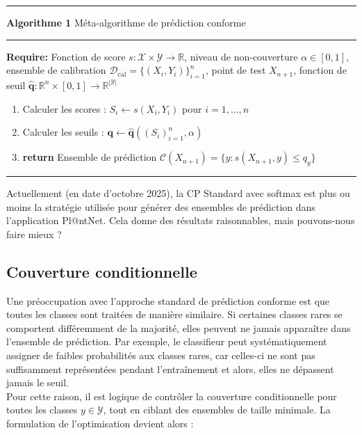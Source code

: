 \documentclass[12pt,a4paper]{article}
\begin{document}
\noindent
\rule{\textwidth}{1pt}
\textbf{Algorithme 1} Méta-algorithme de prédiction conforme \\
\rule{\textwidth}{0.5pt}
\textbf{Require:} Fonction de score $s : \mathcal{X} \times \mathcal{Y} \to \mathbb{R}$, niveau de non-couverture $\alpha \in [0, 1]$, ensemble de calibration $\mathcal{D}_{\text{cal}} = \{(X_i, Y_i)\}_{i=1}^n$, point de test $X_{n+1}$, fonction de seuil $\hat{\mathbf{q}} : \mathbb{R}^n \times [0, 1] \to \mathbb{R}^{|\mathcal{Y}|}$

\begin{enumerate}[label=\arabic*:, itemsep=0pt]
\item Calculer les scores : $S_i \leftarrow s(X_i, Y_i)$ pour $i = 1, \dots, n$
\item Calculer les seuils : $\mathbf{q} \leftarrow \hat{\mathbf{q}}((S_i)_{i=1}^n, \alpha)$
\item \textbf{return} Ensemble de prédiction $\mathcal{C}(X_{n+1}) = \{y : s(X_{n+1}, y) \le q_y\}$
\end{enumerate}

\rule{\textwidth}{1pt}
\vspace{1em}

\noindent Actuellement (en date d'octobre 2025), la CP Standard avec softmax est plus ou moins la stratégie utilisée pour générer des ensembles de prédiction dans l'application Pl@ntNet. Cela donne des résultats raisonnables, mais pouvons-nous faire mieux ?





\subsection{Couverture conditionnelle}

\noindent Une préoccupation avec l'approche standard de prédiction conforme est que toutes les classes sont traitées de manière similaire. Si certaines classes rares se comportent différemment de la majorité, elles peuvent ne jamais apparaître dans l'ensemble de prédiction. Par exemple, le classifieur peut systématiquement assigner de faibles probabilités aux classes rares, car celles-ci ne sont pas suffisamment représentées pendant l'entraînement et alors, elles ne dépassent jamais le seuil.\\

\noindent Pour cette raison, il est logique de contrôler la couverture conditionnelle pour toutes les classes $y \in \mathcal{Y}$, tout en ciblant des ensembles de taille minimale. La formulation de l'optimisation devient alors :
\end{document}
